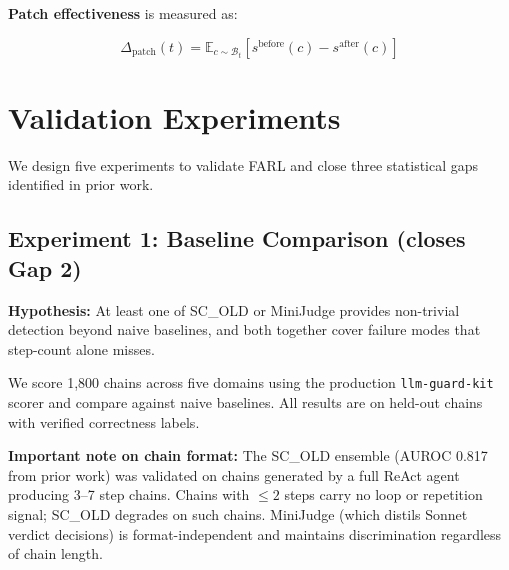\documentclass[11pt,a4paper]{article}
\begin{document}
\textbf{Patch effectiveness} is measured as:

\begin{equation}
\Delta_\text{patch}(t) = \mathbb{E}_{c \sim \mathcal{B}_t}
\!\left[s^\text{before}(c) - s^\text{after}(c)\right]
\label{eq:dpatch}
\end{equation}

\section{Validation Experiments}
\label{sec:experiments}

We design five experiments to validate FARL and close three statistical gaps
identified in prior work.

\subsection{Experiment 1: Baseline Comparison (closes Gap 2)}

\textbf{Hypothesis:} At least one of SC\_OLD or MiniJudge provides
non-trivial detection beyond naive baselines, and both together cover
failure modes that step-count alone misses.

We score 1,800 chains across five domains using the production
\texttt{llm-guard-kit} scorer and compare against naive baselines.
All results are on held-out chains with verified correctness labels.

\textbf{Important note on chain format:} The SC\_OLD ensemble (AUROC 0.817
from prior work) was validated on chains generated by a full ReAct agent
producing 3--7 step chains. Chains with $\leq 2$ steps carry no loop
or repetition signal; SC\_OLD degrades on such chains.
MiniJudge (which distils Sonnet verdict decisions) is format-independent
and maintains discrimination regardless of chain length.
\end{document}
